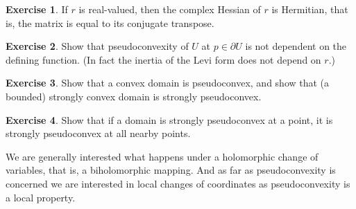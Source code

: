 \documentclass[12pt,openany]{book}
\theoremstyle{plain}
\theoremstyle{remark}
\theoremstyle{definition}
\newenvironment{exbox}{%
    \def\FrameCommand{\vrule width 1pt \relax\hspace {10pt}}%
    \MakeFramed {\advance \hsize -\width \FrameRestore }%
}{%
    \endMakeFramed
}
\theoremstyle{exercise}
\newtheorem{exercise}{Exercise}[section]
\theoremstyle{example}
\begin{document}
\begin{exbox}
\begin{exercise}
If $r$ is real-valued, then the complex Hessian of $r$ is Hermitian, that
is, the matrix is equal to its conjugate transpose.
\end{exercise}

\begin{exercise}
Show that pseudoconvexity of $U$ at $p \in \partial U$ is not dependent
on the defining function.
(In fact the inertia
of the Levi form does not depend on $r$.)
\end{exercise}

\begin{exercise}
Show that a convex domain is pseudoconvex, and show that (a bounded)
strongly convex
domain is strongly pseudoconvex.
\end{exercise}

\begin{exercise}
Show that if a domain is strongly pseudoconvex at a point, it is strongly
pseudoconvex at all nearby points.
\end{exercise}
\end{exbox}

We are generally interested what happens under a holomorphic change of
variables, that is, a biholomorphic mapping.  And as far as pseudoconvexity
is concerned we are interested in local changes of coordinates as
pseudoconvexity is a local property.
\end{document}
